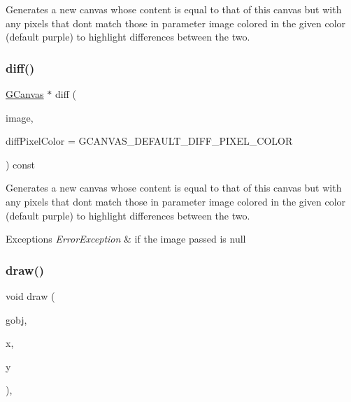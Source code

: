 Generates a new canvas whose content is equal to that of this canvas but with any pixels that don\textquotesingle{}t match those in parameter \textquotesingle{}image\textquotesingle{} colored in the given color (default purple) to highlight differences between the two. 

\mbox{\label{classGCanvas_a5385d5c8fda55dfe0b20851d293b338b}} 
\subsubsection{\texorpdfstring{diff()}{diff()}\hspace{0.1cm}{\footnotesize\ttfamily [2/2]}}
{\footnotesize\ttfamily \mbox{\hyperlink{classGCanvas}{G\+Canvas}} $\ast$ diff (\begin{DoxyParamCaption}\item[{const \mbox{\hyperlink{classGCanvas}{G\+Canvas}} $\ast$}]{image,  }\item[{int}]{diff\+Pixel\+Color = {\ttfamily GCANVAS\+\_\+DEFAULT\+\_\+DIFF\+\_\+PIXEL\+\_\+COLOR} }\end{DoxyParamCaption}) const\hspace{0.3cm}{\ttfamily [virtual]}}



Generates a new canvas whose content is equal to that of this canvas but with any pixels that don\textquotesingle{}t match those in parameter \textquotesingle{}image\textquotesingle{} colored in the given color (default purple) to highlight differences between the two. 


\begin{DoxyExceptions}{Exceptions}
{\em Error\+Exception} & if the image passed is null \\
\hline
\end{DoxyExceptions}
\mbox{\label{classGDrawingSurface_acc3825d7a24815d1e2f78e7c3ffea6cc}} 
\subsubsection{\texorpdfstring{draw()}{draw()}\hspace{0.1cm}{\footnotesize\ttfamily [1/5]}}
{\footnotesize\ttfamily void draw (\begin{DoxyParamCaption}\item[{\mbox{\hyperlink{classGObject}{G\+Object}} $\ast$}]{gobj,  }\item[{double}]{x,  }\item[{double}]{y }\end{DoxyParamCaption})\hspace{0.3cm}{\ttfamily [virtual]}, {\ttfamily [inherited]}}




